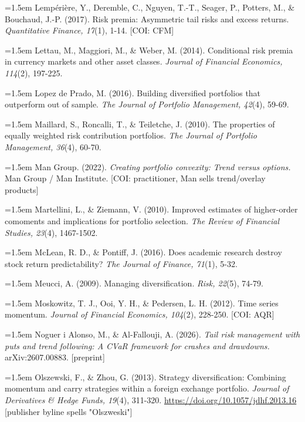 \documentclass[12pt, a4paper]{article}
\begin{document}
\hangindent=1.5em
Lempérière, Y., Deremble, C., Nguyen, T.-T., Seager, P., Potters, M., \&
Bouchaud, J.-P. (2017). Risk premia: Asymmetric tail risks and excess
returns. \emph{Quantitative Finance, 17}(1), 1-14. {[}COI: CFM{]}

\hangindent=1.5em
Lettau, M., Maggiori, M., \& Weber, M. (2014). Conditional risk premia
in currency markets and other asset classes. \emph{Journal of Financial
Economics, 114}(2), 197-225.

\hangindent=1.5em
Lopez de Prado, M. (2016). Building diversified portfolios that
outperform out of sample. \emph{The Journal of Portfolio Management,
42}(4), 59-69.

\hangindent=1.5em
Maillard, S., Roncalli, T., \& Teiletche, J. (2010). The properties of
equally weighted risk contribution portfolios. \emph{The Journal of
Portfolio Management, 36}(4), 60-70.

\hangindent=1.5em
Man Group. (2022). \emph{Creating portfolio convexity: Trend versus
options.} Man Group / Man Institute. {[}COI: practitioner, Man sells
trend/overlay products{]}

\hangindent=1.5em
Martellini, L., \& Ziemann, V. (2010). Improved estimates of
higher-order comoments and implications for portfolio selection.
\emph{The Review of Financial Studies, 23}(4), 1467-1502.

\hangindent=1.5em
McLean, R. D., \& Pontiff, J. (2016). Does academic research destroy
stock return predictability? \emph{The Journal of Finance, 71}(1), 5-32.

\hangindent=1.5em
Meucci, A. (2009). Managing diversification. \emph{Risk, 22}(5), 74-79.

\hangindent=1.5em
Moskowitz, T. J., Ooi, Y. H., \& Pedersen, L. H. (2012). Time series
momentum. \emph{Journal of Financial Economics, 104}(2), 228-250.
{[}COI: AQR{]}

\hangindent=1.5em
Noguer i Alonso, M., \& Al-Fallouji, A. (2026). \emph{Tail risk
management with puts and trend following: A CVaR framework for crashes
and drawdowns.} arXiv:2607.00883. {[}preprint{]}

\hangindent=1.5em
Olszewski, F., \& Zhou, G. (2013). Strategy diversification: Combining
momentum and carry strategies within a foreign exchange portfolio.
\emph{Journal of Derivatives \& Hedge Funds, 19}(4), 311-320.
\url{https://doi.org/10.1057/jdhf.2013.16} {[}publisher byline spells
"Olszweski"{]}
\end{document}
